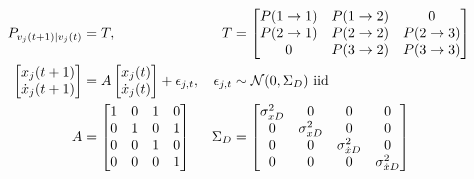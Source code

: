 \documentclass[12pt]{article}
\newcommand{\normal}[2]{{\cal N}(#1,#2)}
\newcommand{\xdot}{{\dot x}}
\begin{document}
\begin{subequations}
  \label{eq:dynamics}
  \begin{align}
    P_{v_j(t+1)|v_j(t)} &= T, & T &=
    \begin{bmatrix}
      P(1 \rightarrow 1) & P(1 \rightarrow 2) & 0 \\
      P(2 \rightarrow 1) & P(2 \rightarrow 2) & P(2 \rightarrow 3) \\
      0 & P(3 \rightarrow 2) & P(3 \rightarrow 3)
    \end{bmatrix} \\
    \begin{bmatrix} x_j(t+1) \\ \xdot_j(t+1) \end{bmatrix}
    &= A   \begin{bmatrix} x_j(t) \\ \xdot_j(t) \end{bmatrix}
    + \epsilon_{j,t}, & \epsilon_{j,t} &\sim
    \normal{0}{\Sigma_{D}} \text{ iid} \\
    A &= \begin{bmatrix}
      1 & 0 & 1 & 0 \\
      0 & 1 & 0 & 1 \\
      0 & 0 & 1 & 0 \\
      0 & 0 & 0 & 1
    \end{bmatrix} &
    \Sigma_{D} &= \begin{bmatrix}
      \sigma^2_{xD} & 0 & 0 & 0 \\
      0 & \sigma^2_{xD} & 0 & 0 \\
      0 & 0 & \sigma^2_{\xdot D} & 0 \\
      0 & 0 & 0 & \sigma^2_{\xdot D}
    \end{bmatrix}
  \end{align}
\end{subequations}
\end{document}
